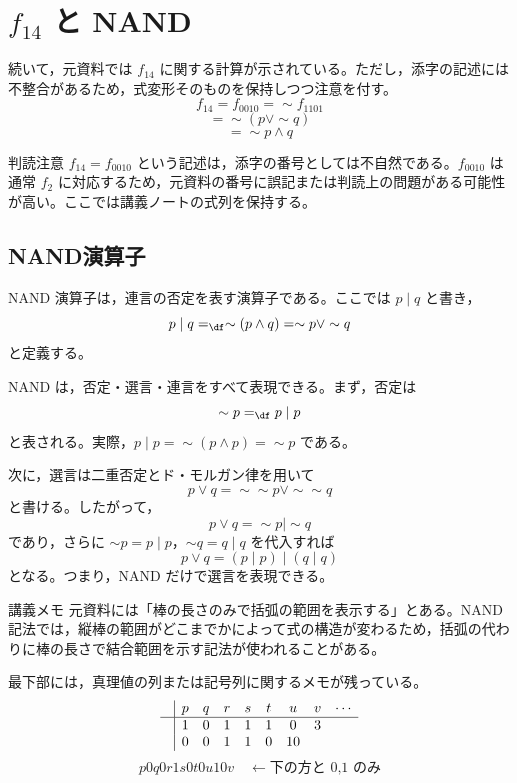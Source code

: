 \documentclass[../main.tex]{subfiles}
\begin{document}
\section{\texorpdfstring{\(f_{14}\)}{f14} と NAND}

続いて，元資料では \(f_{14}\) に関する計算が示されている。ただし，添字の記述には不整合があるため，式変形そのものを保持しつつ注意を付す。
\[
  f_{14}
  =
  f_{0010}
  =
  \sim f_{1101}
\]
\[
  =
  \sim(p \lor \sim q)
\]
\[
  =
  \sim p \land q
\]

\begin{sidebox}[TBred]{判読注意}
  \(f_{14}=f_{0010}\) という記述は，添字の番号としては不自然である。\(f_{0010}\) は通常 \(f_2\) に対応するため，元資料の番号に誤記または判読上の問題がある可能性が高い。ここでは講義ノートの式列を保持する。
\end{sidebox}

\subsection{NAND演算子}

NAND 演算子は，連言の否定を表す演算子である。ここでは \(p \mid q\) と書き，
\[
  p \mid q
  =_{\df}
  \sim(p \land q)
  =
  \sim p \lor \sim q
\]
と定義する。

NAND は，否定・選言・連言をすべて表現できる。まず，否定は
\[
  \sim p
  =_{\df}
  p \mid p
\]
と表される。実際，\(p \mid p=\sim(p\land p)=\sim p\) である。

次に，選言は二重否定とド・モルガン律を用いて
\[
  p \lor q
  =
  \sim\sim p \lor \sim\sim q
\]
と書ける。したがって，
\[
  p \lor q
  =
  \sim p \mid \sim q
\]
であり，さらに \(\sim p=p\mid p\)，\(\sim q=q\mid q\) を代入すれば
\[
  p \lor q
  =
  (p \mid p) \mid (q \mid q)
\]
となる。つまり，NAND だけで選言を表現できる。

\begin{sidebox}[TBred]{講義メモ}
  元資料には「棒の長さのみで括弧の範囲を表示する」とある。NAND 記法では，縦棒の範囲がどこまでかによって式の構造が変わるため，括弧の代わりに棒の長さで結合範囲を示す記法が使われることがある。
\end{sidebox}

最下部には，真理値の列または記号列に関するメモが残っている。
\[
  \begin{array}{c|cccccccc}
   & p & q & r & s & t & u & v & \cdots \\ \hline
   & 1 & 0 & 1 & 1 & 1 & 0 & 3 &  \\
   & 0 & 0 & 1 & 1 & 0 & 10 &  &
  \end{array}
\]
\[
  p0q0r1s0t0u10v
  \quad
  \leftarrow
  \text{下の方と 0,1 のみ}
\]
\end{document}
